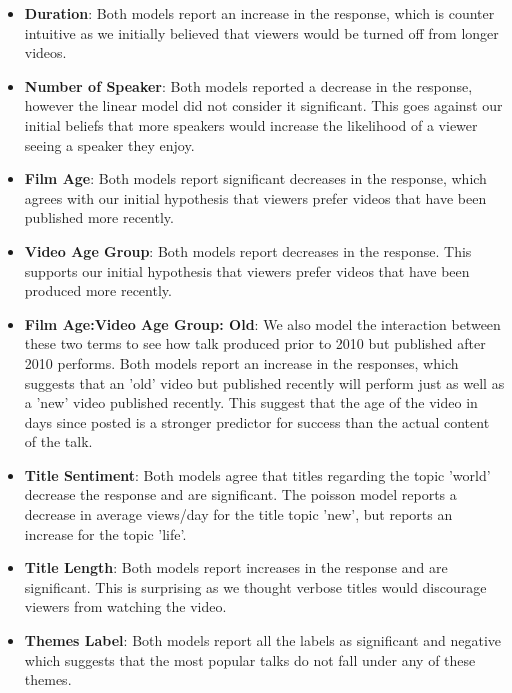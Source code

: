 \begin{itemize}
	\item \textbf{Duration}: Both models report an increase in the response, which is counter intuitive as we initially believed that viewers would be turned off from longer videos.
	\item \textbf{Number of Speaker}: Both models reported a decrease in the response, however the linear model did not consider it significant. This goes against our initial beliefs that more speakers would increase the likelihood of a viewer seeing a speaker they enjoy.
	\item \textbf{Film Age}: Both models report significant decreases in the response, which agrees with our initial hypothesis that viewers prefer videos that have been published more recently. 
	\item \textbf{Video Age Group}: Both models report decreases in the response. This supports our initial hypothesis that viewers prefer videos that have been produced more recently.
	\item \textbf{Film Age:Video Age Group: Old}: We also model the interaction between these two terms to see how talk produced prior to 2010 but published after 2010 performs. Both models report an increase in the responses, which suggests that an 'old' video but published recently will perform just as well as a 'new' video published recently. This suggest that the age of the video in days since posted is a stronger predictor for success than the actual content of the talk. 
	\item \textbf{Title Sentiment}: Both models agree that titles regarding the topic 'world' decrease the response and are significant. The poisson model reports a decrease in average views/day for the title topic 'new', but reports an increase for the topic 'life'.
	\item \textbf{Title Length}: Both models report increases in the response and are significant. This is surprising as we thought verbose titles would discourage viewers from watching the video. 
	\item \textbf{Themes Label}: Both models report all the labels as significant and negative which suggests that the most popular talks do not fall under any of these themes. 
\end{itemize}